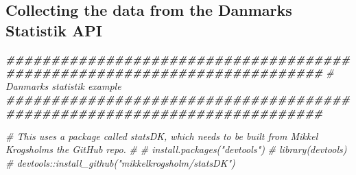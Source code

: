 \documentclass[
]{book}
\newenvironment{Shaded}{\begin{snugshade}}{\end{snugshade}}
\newcommand{\CommentTok}[1]{\textcolor[rgb]{0.56,0.35,0.01}{\textit{#1}}}
\newcommand{\DocumentationTok}[1]{\textcolor[rgb]{0.56,0.35,0.01}{\textbf{\textit{#1}}}}
\begin{document}
\hypertarget{collecting-the-data-from-the-danmarks-statistik-api}{%
\subsection{Collecting the data from the Danmarks Statistik API}\label{collecting-the-data-from-the-danmarks-statistik-api}}

\begin{Shaded}
\begin{Highlighting}[]
\DocumentationTok{\#\#\#\#\#\#\#\#\#\#\#\#\#\#\#\#\#\#\#\#\#\#\#\#\#\#\#\#\#\#\#\#\#\#\#\#\#\#\#\#\#\#\#\#\#\#\#\#\#\#\#\#\#\#\#\#\#\#\#\#\#\#\#\#\#\#\#\#\#\#\#\#\#}
\CommentTok{\# Danmarks statistik example}
\DocumentationTok{\#\#\#\#\#\#\#\#\#\#\#\#\#\#\#\#\#\#\#\#\#\#\#\#\#\#\#\#\#\#\#\#\#\#\#\#\#\#\#\#\#\#\#\#\#\#\#\#\#\#\#\#\#\#\#\#\#\#\#\#\#\#\#\#\#\#\#\#\#\#\#\#\#}

\CommentTok{\# This uses a package called statsDK, which needs to be built from Mikkel Krogsholm\textquotesingle{}s the GitHub repo.}
\CommentTok{\# }
\CommentTok{\#    install.packages("devtools")}
\CommentTok{\#    library(devtools)}
\CommentTok{\#    devtools::install\_github("mikkelkrogsholm/statsDK")}


\end{Highlighting}
\end{Shaded}
\end{document}
